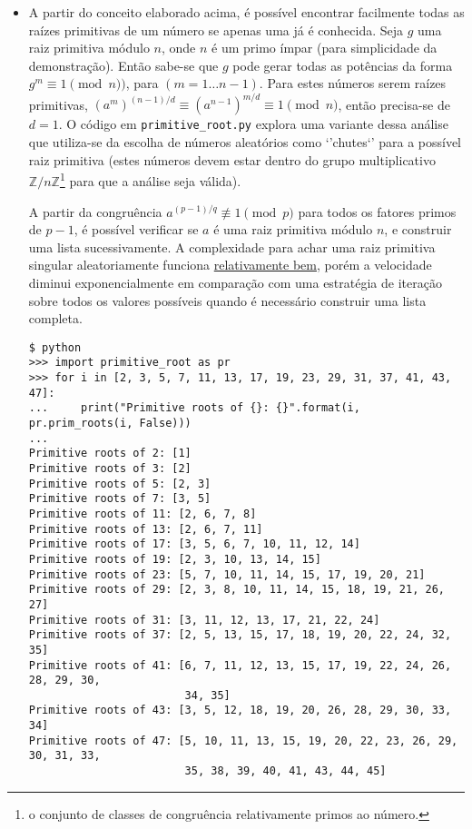 \documentclass{article}
\begin{document}
\begin{itemize}
\item A partir do conceito elaborado acima, é possível encontrar facilmente
todas as raízes primitivas de um número se apenas uma já é conhecida. Seja $g$
uma raiz primitiva módulo $n$, onde $n$ é um primo ímpar (para simplicidade da
demonstração). Então sabe-se que $g$ pode gerar todas as potências da forma $g^m
\equiv 1 \pmod n)$, para $(m = 1 \dots n - 1)$. Para estes números serem raízes
primitivas, $(a^m)^{(n - 1)/d} \equiv (a^{n - 1})^{m/d} \equiv 1 \pmod n$, então
precisa-se de $d = 1$. O código em \texttt{primitive\_root.py} explora uma
variante dessa análise que utiliza-se da escolha de números aleatórios como
`'chutes`' para a possível raiz primitiva (estes números devem estar dentro do
grupo multiplicativo $\mathbb{Z}/n\mathbb{Z}$\footnote{o conjunto de classes de
congruência relativamente primos ao número.} para que a análise seja válida).

A partir da congruência $a^{(p-1)/q} \not\equiv 1 \pmod p$ para todos os fatores
primos de $p-1$, é possível verificar se $a$ é uma raiz primitiva módulo $n$, e
construir uma lista sucessivamente. A complexidade para achar uma raiz primitiva
singular aleatoriamente funciona
\href{http://math.stackexchange.com/a/156250}{relativamente bem}, porém a
velocidade diminui exponencialmente em comparação com uma estratégia de iteração
sobre todos os valores possíveis quando é necessário construir uma lista
completa.
\begin{verbatim}
$ python
>>> import primitive_root as pr
>>> for i in [2, 3, 5, 7, 11, 13, 17, 19, 23, 29, 31, 37, 41, 43, 47]:
...     print("Primitive roots of {}: {}".format(i, pr.prim_roots(i, False)))
...
Primitive roots of 2: [1]
Primitive roots of 3: [2]
Primitive roots of 5: [2, 3]
Primitive roots of 7: [3, 5]
Primitive roots of 11: [2, 6, 7, 8]
Primitive roots of 13: [2, 6, 7, 11]
Primitive roots of 17: [3, 5, 6, 7, 10, 11, 12, 14]
Primitive roots of 19: [2, 3, 10, 13, 14, 15]
Primitive roots of 23: [5, 7, 10, 11, 14, 15, 17, 19, 20, 21]
Primitive roots of 29: [2, 3, 8, 10, 11, 14, 15, 18, 19, 21, 26, 27]
Primitive roots of 31: [3, 11, 12, 13, 17, 21, 22, 24]
Primitive roots of 37: [2, 5, 13, 15, 17, 18, 19, 20, 22, 24, 32, 35]
Primitive roots of 41: [6, 7, 11, 12, 13, 15, 17, 19, 22, 24, 26, 28, 29, 30,
                        34, 35]
Primitive roots of 43: [3, 5, 12, 18, 19, 20, 26, 28, 29, 30, 33, 34]
Primitive roots of 47: [5, 10, 11, 13, 15, 19, 20, 22, 23, 26, 29, 30, 31, 33,
                        35, 38, 39, 40, 41, 43, 44, 45]
\end{verbatim}


\end{itemize}
\end{document}
